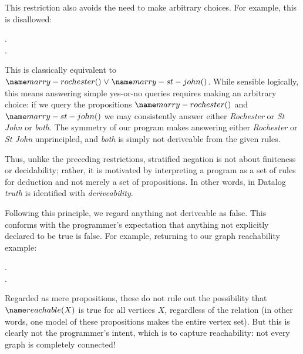 This restriction also avoids the need to make arbitrary choices. For example,
this is disallowed:

\begin{datalog}
   \gets \neg {}.\\
   \gets \neg {}.
\end{datalog}

\noindent
This is classically equivalent to $\atom{marry-rochester}{} \vee
\atom{marry-st-john}{}$. While sensible logically, this means answering simple
yes-or-no queries requires making an arbitrary choice: if we query the
propositions $\atom{marry-rochester}{}$ and $\atom{marry-st-john}{}$ we
may consistently answer either \emph{Rochester} or \emph{St John} or
\emph{both}.
%
The symmetry of our program makes answering either
\emph{Rochester} or \emph{St John} unprincipled, and \emph{both} is simply
not deriveable from the given rules.%
%

Thus, unlike the preceding restrictions, stratified negation is not about
finiteness or decidability; rather, it is motivated by interpreting a program
as a set of rules for deduction and not merely a set of propositions. In other
words, in Datalog \emph{truth} is identified with \emph{deriveability}.

Following this principle, we regard anything not deriveable as false. This
conforms with the programmer's expectation that anything not explicitly declared
to be true is false. For example, returning to our graph reachability example:

\begin{datalog}
   \gets {} \conj {}.\\
  .
\end{datalog}


\noindent
Regarded as mere propositions, these do not rule out the possibility that
$\atom{reachable}{X}$ is true for all vertices $X$, regardless of the
 relation (in other words, one model of these propositions makes
 the entire vertex set). But this is clearly not the
programmer's intent, which is to capture reachability: not every graph is
completely connected!

